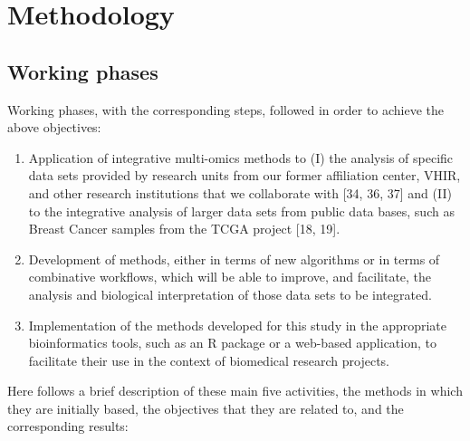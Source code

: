 \documentclass[a4paper, nobind]{templates/ociamthesis}
\renewcommand{\chaptermark}[1]{\markboth{\thechapter. #1}{\thechapter. #1}}
\begin{document}
\hypertarget{methods}{%
\chapter{Methodology}\label{methods}}

\chaptermark{Methods}

\minitoc 

\hypertarget{work-phases}{%
\section{Working phases}\label{work-phases}}

Working phases, with the corresponding steps, followed in order to achieve the above objectives:

\begin{enumerate}
\def\labelenumi{\arabic{enumi}.}
\item
  Application of integrative multi-omics methods to (I) the analysis of specific data sets provided by research units from our former affiliation center, VHIR, and other research institutions that we collaborate with {[}34, 36, 37{]} and (II) to the integrative analysis of larger data sets from public data bases, such as Breast Cancer samples from the TCGA project {[}18, 19{]}.
\item
  Development of methods, either in terms of new algorithms or in terms of combinative workflows, which will be able to improve, and facilitate, the analysis and biological interpretation of those data sets to be integrated.
\item
  Implementation of the methods developed for this study in the appropriate bioinformatics tools, such as an R package or a web-based application, to facilitate their use in the context of biomedical research projects.
\end{enumerate}

Here follows a brief description of these main five activities, the methods in which they are initially based, the objectives that they are related to, and the corresponding results:
\end{document}
